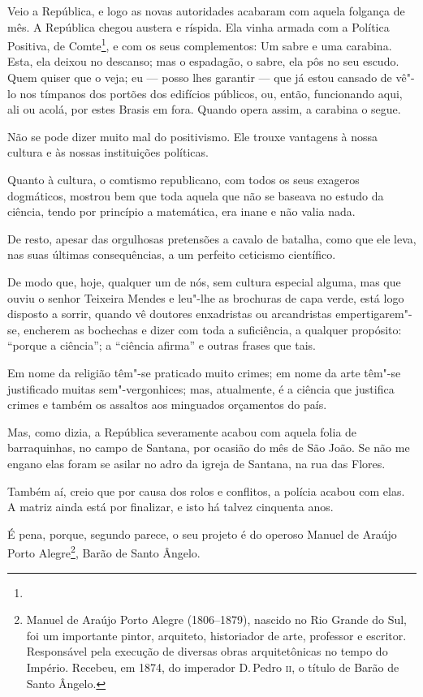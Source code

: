 Veio a República, e logo as novas autoridades acabaram com aquela
folgança de mês. A República chegou austera e ríspida. Ela vinha armada
com a Política Positiva, de Comte\footnote{}, e com os seus complementos: Um sabre e uma carabina. Esta, ela
deixou no descanso; mas o espadagão, o sabre, ela pôs no seu escudo.
Quem quiser que o veja; eu --- posso lhes garantir --- que já estou
cansado de vê"-lo nos tímpanos dos portões dos edifícios públicos, ou,
então, funcionando aqui, ali ou acolá, por estes Brasis em fora. Quando
opera assim, a carabina o segue.

Não se pode dizer muito mal do positivismo. Ele trouxe vantagens à nossa
cultura e às nossas instituições políticas.

Quanto à cultura, o comtismo republicano, com todos os seus exageros
dogmáticos, mostrou bem que toda aquela que não se baseava no estudo da
ciência, tendo por princípio a matemática, era inane e não valia nada.

De resto, apesar das orgulhosas pretensões a cavalo de batalha, como que
ele leva, nas suas últimas consequências, a um perfeito ceticismo
científico.

De modo que, hoje, qualquer um de nós, sem cultura especial alguma, mas
que ouviu o senhor Teixeira Mendes e leu"-lhe as brochuras de capa verde,
está logo disposto a sorrir, quando vê doutores enxadristas ou
arcandristas empertigarem"-se, encherem as bochechas e dizer com toda a
suficiência, a qualquer propósito: ``porque a ciência''; a ``ciência
afirma'' e outras frases que tais.

Em nome da religião têm"-se praticado muito crimes; em nome da arte
têm"-se justificado muitas sem"-vergonhices; mas, atualmente, é a ciência
que justifica crimes e também os assaltos aos minguados orçamentos do
país.

Mas, como dizia, a República severamente acabou com aquela folia de
barraquinhas, no campo de Santana, por ocasião do mês de São João. Se
não me engano elas foram se asilar no adro da igreja de Santana, na rua
das Flores.

Também aí, creio que por causa dos rolos e conflitos, a polícia acabou
com elas. A matriz ainda está por finalizar, e isto há talvez cinquenta
anos.

É pena, porque, segundo parece, o seu projeto é do operoso Manuel de
Araújo Porto Alegre\footnote{Manuel de Araújo Porto Alegre (1806--1879), nascido no Rio Grande do Sul, foi um importante pintor,
  arquiteto, historiador de arte, professor e escritor. Responsável pela
  execução de diversas obras arquitetônicas no tempo do Império.
  Recebeu, em 1874, do imperador D.\,Pedro \textsc{ii}, o título de Barão de Santo
  Ângelo.}, Barão de Santo Ângelo.

